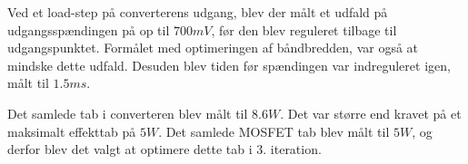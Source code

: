 Ved et load-step på converterens udgang, blev der målt et udfald på udgangsspændingen på op til $700mV$, før den blev reguleret tilbage til udgangspunktet. Formålet med optimeringen af båndbredden, var også at mindske dette udfald. Desuden blev tiden før spændingen var indreguleret igen, målt til $1.5ms$. 

Det samlede tab i converteren blev målt til $8.6W$. Det var større end kravet på et maksimalt effekttab på $5W$. Det samlede MOSFET tab blev målt til $5W$, og derfor blev det valgt at optimere dette tab i 3. iteration. 








